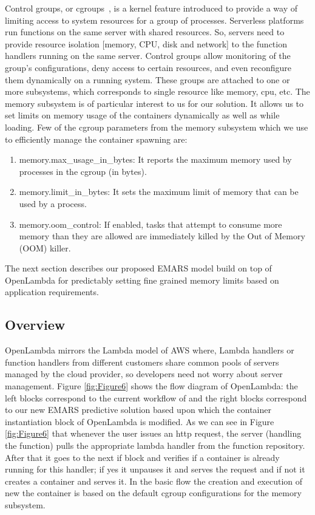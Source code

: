 \documentclass[letterpaper,twocolumn,10pt]{article}
\begin{document}
Control groups, or cgroups~\cite{cgroup}, is a kernel feature introduced to provide a way of limiting access to system resources for a group of processes. Serverless platforms run functions on the same server with shared resources. So, servers need to provide resource isolation [memory, CPU, disk and network] to the function handlers running on the same server. Control groups allow monitoring of the group's configurations, deny access to certain resources, and even reconfigure them dynamically on a running system. These groups are attached to one or more subsystems, which corresponds to single resource like memory, cpu, etc. The memory subsystem is of particular interest to us for our solution. It allows us to set limits on memory usage of the containers dynamically as well as while loading. Few of the cgroup parameters from the memory subsystem which we use to efficiently manage the container spawning are:
\begin{enumerate}
\item memory.max\_usage\_in\_bytes: It reports the maximum memory used by processes in the cgroup (in bytes).
\item memory.limit\_in\_bytes: It sets the maximum limit of memory that can be used by a process. 
\item memory.oom\_control: If enabled, tasks that attempt to consume more memory than they are allowed are immediately killed by the Out of Memory (OOM) killer.
\end{enumerate}

The next section describes our proposed EMARS model build on top of OpenLambda for predictably setting fine grained memory limits based on application requirements. 

\subsection{Overview}

OpenLambda mirrors the Lambda model of AWS where, Lambda handlers or function handlers from different customers share common pools of servers managed by the cloud provider, so developers
need not worry about server management. 
Figure \ref{fig:Figure6} shows the flow diagram of OpenLambda: the left blocks correspond to the current workflow of and the right blocks correspond to our new EMARS predictive solution based upon which the container instantiation block of OpenLambda is modified.
As we can see in Figure \ref{fig:Figure6} that whenever the user issues an http request, the server (handling the function) pulls the appropriate lambda handler from the function repository. After that it goes to the next if block and verifies if a container is already running for this handler; if yes it unpauses it and serves the request and if not it creates a container and serves it. In the basic flow the creation and execution of new the container is based on the default cgroup configurations for the memory subsystem. 
\end{document}
